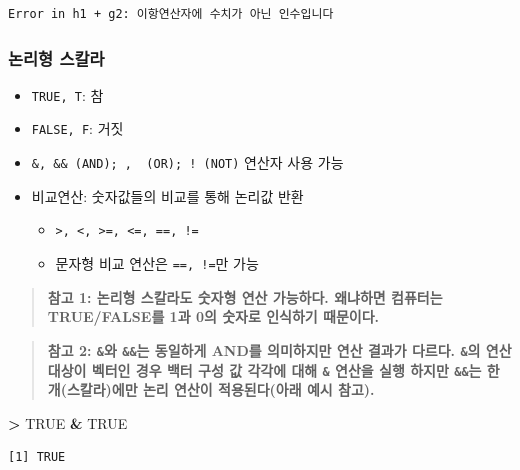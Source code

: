 \documentclass[11pt,a4paper]{book}
\newenvironment{Shaded}{\begin{snugshade}}{\end{snugshade}}
\newcommand{\StringTok}[1]{\textcolor[rgb]{0.31,0.60,0.02}{#1}}
\newcommand{\OtherTok}[1]{\textcolor[rgb]{0.56,0.35,0.01}{#1}}
\newcommand{\OperatorTok}[1]{\textcolor[rgb]{0.81,0.36,0.00}{\textbf{#1}}}
\providecommand{\tightlist}{%
  \setlength{\itemsep}{0pt}\setlength{\parskip}{0pt}}
\theoremstyle{definition}
\theoremstyle{definition}
\theoremstyle{definition}
\theoremstyle{remark}
\begin{document}
\begin{verbatim}
Error in h1 + g2: 이항연산자에 수치가 아닌 인수입니다
\end{verbatim}

\normalsize

\subsubsection{논리형 스칼라}\label{-}

\begin{itemize}
\tightlist
\item
  \texttt{TRUE,\ T}: 참
\item
  \texttt{FALSE,\ F}: 거짓
\item
  \texttt{\&,\ \&\&\ (AND);\ \textbar{},\ \textbar{}\textbar{}\ (OR);\ !\ (NOT)}
  연산자 사용 가능
\item
  비교연산: 숫자값들의 비교를 통해 논리값 반환

  \begin{itemize}
  \tightlist
  \item
    \texttt{\textgreater{},\ \textless{},\ \textgreater{}=,\ \textless{}=,\ ==,\ !=}
  \item
    문자형 비교 연산은 \texttt{==,\ !=}만 가능
  \end{itemize}
\end{itemize}

\begin{quote}
\textbf{참고 1: 논리형 스칼라도 숫자형 연산 가능하다. 왜냐하면 컴퓨터는
TRUE/FALSE를 1과 0의 숫자로 인식하기 때문이다.}
\end{quote}

\begin{quote}
\textbf{참고 2: \texttt{\&}와 \texttt{\&\&}는 동일하게 AND를 의미하지만
연산 결과가 다르다. \texttt{\&}의 연산 대상이 벡터인 경우 백터 구성 값
각각에 대해 \texttt{\&} 연산을 실행 하지만 \texttt{\&\&}는 한
개(스칼라)에만 논리 연산이 적용된다(아래 예시 참고).}
\end{quote}

\footnotesize

\begin{Shaded}
\begin{Highlighting}[]
\OperatorTok{>}\StringTok{ }\OtherTok{TRUE} \OperatorTok{&}\StringTok{ }\OtherTok{TRUE}
\end{Highlighting}
\end{Shaded}

\begin{verbatim}
[1] TRUE
\end{verbatim}
\end{document}
